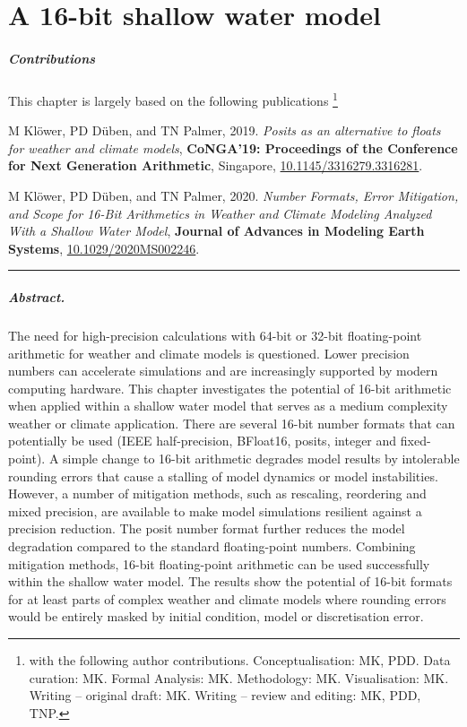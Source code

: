 \chapter{A 16-bit shallow water model}
\label{chap:shallow_water}

\small \paragraph{Contributions} This chapter is largely based on the following publications \footnote{with the following author contributions.
Conceptualisation: MK, PDD. Data curation: MK. Formal Analysis: MK. Methodology: MK. Visualisation: MK. Writing – original draft:
MK. Writing – review and editing: MK, PDD, TNP.}

\vspace{\baselineskip}
\indent M Klöwer, PD Düben, and TN Palmer, 2019. \emph{Posits as an alternative to floats for weather and climate models},
\textbf{CoNGA'19: Proceedings of the Conference for Next Generation Arithmetic}, Singapore,
\href{https://doi.org/10.1145/3316279.3316281}{10.1145/3316279.3316281}.

\indent M Klöwer, PD Düben, and TN Palmer, 2020. \emph{Number Formats, Error Mitigation, and Scope for 16-Bit Arithmetics
in Weather and Climate Modeling Analyzed With a Shallow Water Model}, \textbf{Journal of Advances in Modeling Earth Systems},
\href{https://doi.org/10.1029/2020MS002246}{10.1029/2020MS002246}.
\vspace{\baselineskip}
\hrule
\vspace{\baselineskip}
\normalsize

\paragraph{Abstract.} The need for high-precision calculations with 64-bit or 32-bit floating-point arithmetic for weather and
climate models is questioned. Lower precision numbers can accelerate simulations and are increasingly supported
by modern computing hardware. This chapter investigates the potential of 16-bit arithmetic when applied within a shallow
water model that serves as a medium complexity weather or climate application. There are several 16-bit number
formats that can potentially be used (IEEE half-precision, BFloat16, posits, integer and fixed-point). A simple change to
16-bit arithmetic degrades model results by intolerable rounding errors that cause a stalling of model dynamics or model instabilities.
However, a number of mitigation methods, such as rescaling, reordering and mixed precision, are available to make model
simulations resilient against a precision reduction. The posit number format further reduces the model degradation compared to
the standard floating-point numbers. Combining mitigation methods, 16-bit floating-point arithmetic can be used
successfully within the shallow water model. The results show the potential of 16-bit formats for at least parts of complex weather
and climate models where rounding errors would be entirely masked by initial condition, model or discretisation error.

